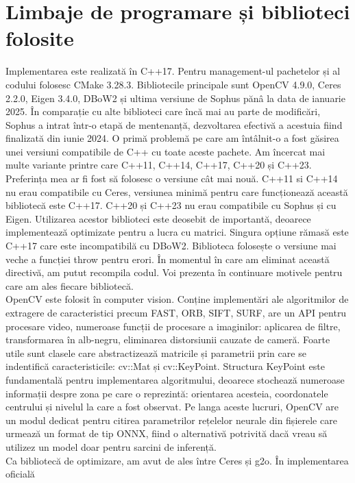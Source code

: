 \documentclass[12pt,a4paper]{report}
\begin{document}
\section{Limbaje de programare și biblioteci folosite}
Implementarea este realizată în C++17. Pentru management-ul pachetelor și al codului folosesc
CMake 3.28.3. Bibliotecile principale sunt OpenCV\cite{itseez2015opencv} 4.9.0,
Ceres\cite{CeresSolver} 2.2.0, Eigen 3.4.0, DBoW2\cite{bagofwordslibrary} și ultima versiune de Sophus
pănâ la data de ianuarie 2025. În comparație cu alte biblioteci care încă mai au parte de modificări,
Sophus a intrat într-o etapă de mentenanță, dezvoltarea efectivă a acestuia fiind finalizată din iunie 2024.
O primă problemă pe care am întâlnit-o a fost găsirea 
unei versiuni compatibile de C++ cu toate aceste pachete. Am încercat mai multe variante printre 
care C++11, C++14, C++17, C++20 și C++23. Preferința mea ar fi fost să folosesc o versiune cât mai nouă.
C++11 si C++14 nu erau compatibile cu Ceres, versiunea minimă pentru care funcționează această bibliotecă
este C++17. C++20 și C++23 nu erau compatibile cu Sophus și cu Eigen. Utilizarea acestor biblioteci este deosebit 
de importantă, deoarece implementează optimizate pentru a lucra cu matrici.\@ 
Singura opțiune rămasă este C++17 care este incompatibilă cu DBoW2. Biblioteca 
folosește o versiune mai veche a funcției throw pentru erori. În momentul în care am eliminat această
directivă, am putut recompila codul. Voi prezenta în continuare motivele pentru care 
am ales fiecare bibliotecă. \\
OpenCV este folosit în computer vision. Conține implementări ale algoritmilor de extragere de
caracteristici precum FAST, ORB, SIFT, SURF, are un API pentru procesare video, numeroase funcții de procesare
a imaginilor: aplicarea de filtre, transformarea în alb-negru, eliminarea distorsiunii
cauzate de cameră. Foarte utile sunt clasele care abstractizează matricile și parametrii 
prin care se indentifică caracteristicile: cv::Mat și cv::KeyPoint. Structura KeyPoint este 
fundamentală pentru implementarea algoritmului, deoarece stochează numeroase informații despre zona
pe care o reprezintă: orientarea acesteia, coordonatele centrului și nivelul la care a fost observat. 
Pe langa aceste lucruri, OpenCV are un modul dedicat pentru citirea parametrilor rețelelor neurale din fișierele care 
urmează un format de tip ONNX, fiind o alternativă potrivită dacă vreau să utilizez un model doar 
pentru sarcini de inferență.  \\
Ca bibliotecă de optimizare, am avut de ales între Ceres și g2o\cite{g2oLibrary}. În implementarea oficială 
\end{document}
